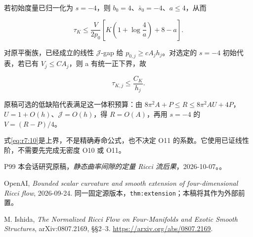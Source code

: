 \documentclass[UTF8,11pt,fontset=none]{ctexart}
\begin{document}
若初始度量已归一化为 \(s=-4\)，则 \(b_0=4\)、\(\bar s_0=-4\)、\(a\le4\)，从而

\[
 \boxed{
 \tau_K\le\frac{V}{2p_0}
 \left[K\left(1+\log\frac4a\right)+8-a\right].
 }
\tag{7.9}\label{eq:r7:9}
\]

对原平衡族，已经成立的线性 \(\mathcal J\)-gap 给 \(p_{0,j}\ge cA_jh_j\)。对选定的 \(s=-4\) 初始代表，若已有 \(V_j\le C A_j\)，则 a 有统一正下界，故

\[
 \boxed{\tau_{K,j}\le\frac{C_K}{h_j}.}
\tag{7.10}\label{eq:r7:10}
\]

原稿可选的低缺陷代表满足这一体积预算：由 \(8\pi^2A+P\le R\le8\pi^2AU+4P\)， \(U=1+O(h)\)、\(\mathcal J=O(h)\)，得 \(R=O(A)\)，再用 \(s=-4\) 的 \(V=(R-P)/4\)。

式\eqref{eq:r7:10}是上界，不是精确寿命公式，也不决定 O11 的系数。它使用已证线性阶，不需要先完成无密度 O10 或 O11。

\begin{thebibliography}{P99}
\small
{} 本会话研究原稿，\emph{静态曲率间隙的定量 Ricci 流后果}，2026-10-07。。

 OpenAI, \emph{Bounded scalar curvature and smooth extension of four-dimensional Ricci flow}, 2026-09-24. 同一固定源版本，\texttt{thm:extension}；本稿将其作为外部前置。

 M. Ishida, \emph{The Normalized Ricci Flow on Four-Manifolds and Exotic Smooth Structures}, arXiv:0807.2169, §§2--3. \url{https://arxiv.org/abs/0807.2169}.

\end{thebibliography}
\end{document}
